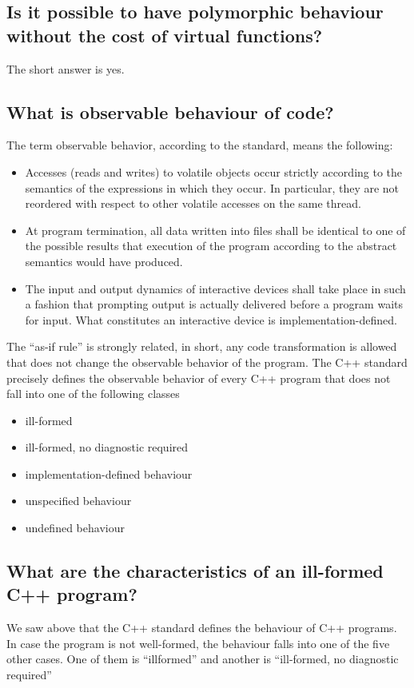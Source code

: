 \documentclass{report}
\begin{document}
\bigbreak \noindent 
\subsection{Is it possible to have polymorphic behaviour without the cost of virtual functions?}
\bigbreak \noindent 
The short answer is yes.

\pagebreak 
{}
\bigbreak \noindent 
\subsection{What is observable behaviour of code?}
\bigbreak \noindent 
The term observable behavior, according to the standard, means the following:
\begin{itemize}
    \item Accesses (reads and writes) to volatile objects occur strictly according to the semantics of the expressions in which they occur. In particular, they are not reordered with respect to other volatile accesses on the same thread.
    \item At program termination, all data written into files shall be identical to one of the possible results that execution of the program according to the abstract semantics would have produced.
    \item The input and output dynamics of interactive devices shall take place in such a fashion that prompting output is actually delivered before a program waits for input. What constitutes an interactive device is implementation-defined.
\end{itemize}
\bigbreak \noindent 
The “as-if rule” is strongly related, in short, any code transformation is allowed that does not change the observable behavior of the
program.
\bigbreak \noindent 
The C++ standard precisely defines the observable behavior of
every C++ program that does not fall into one of the following
classes
\begin{itemize}
    \item ill-formed
    \item ill-formed, no diagnostic required
    \item implementation-defined behaviour
    \item unspecified behaviour
    \item undefined behaviour
\end{itemize}
\bigbreak \noindent 
\subsection{What are the characteristics of an ill-formed C++ program?}
\bigbreak \noindent 
We saw above that the C++ standard defines the behaviour
of C++ programs. In case the program is not well-formed, the
behaviour falls into one of the five other cases. One of them is “illformed” and another is “ill-formed, no diagnostic required”
\bigbreak \noindent 
\end{document}
